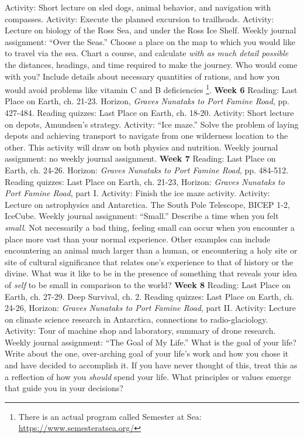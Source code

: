 \documentclass[10pt]{article}
\begin{document}
\begin{outline}[enumerate]
\2 Activity: Short lecture on sled dogs, animal behavior, and navigation with compasses.
\2 Activity: Execute the planned excursion to trailheads.
\2 Activity: Lecture on biology of the Ross Sea, and under the Ross Ice Shelf.
\2 Weekly journal assignment: ``Over the Seas.''  Choose a place on the map to which you would like to travel via the sea.  Chart a course, and calculate \textit{with as much detail possible} the distances, headings, and time required to make the journey.  Who would come with you?  Include details about necessary quantities of rations, and how you would avoid problems like vitamin C and B deficiencies \footnote{There is an actual program called Semester at Sea: \url{https://www.semesteratsea.org/}}.
\1 \textbf{Week 6}
\2 Reading: Last Place on Earth, ch. 21-23. Horizon, \textit{Graves Nunataks to Port Famine Road}, pp. 427-484.
\2 Reading quizzes: Last Place on Earth, ch. 18-20.
\2 Activity: Short lecture on depots, Amundsen's strategy.
\2 Activity: ``Ice maze.''  Solve the problem of laying depots and achieving transport to navigate from one wilderness location to the other.  This activity will draw on both physics and nutrition.
\2 Weekly journal assignment: no weekly journal assignment.
\1 \textbf{Week 7}
\2 Reading: Last Place on Earth, ch. 24-26. Horizon: \textit{Graves Nunataks to Port Famine Road}, pp. 484-512.
\2 Reading quizzes: Last Place on Earth, ch. 21-23, Horizon: \textit{Graves Nunataks to Port Famine Road}, part I.
\2 Activity: Finish the ice maze activity.
\2 Activity: Lecture on astrophysics and Antarctica.  The South Pole Telescope, BICEP 1-2, IceCube.
\2 Weekly journal assignment: ``Small.'' Describe a time when you felt \textit{small}.  Not necessarily a bad thing, feeling small can occur when you encounter a place more vast than your normal experience.  Other examples can include encountering an animal much larger than a human, or encountering a holy site or site of cultural significance that relates one's experience to that of history or the divine.  What was it like to be in the presence of something that reveals your idea of \textit{self} to be small in comparison to the world?
\1 \textbf{Week 8}
\2 Reading: Last Place on Earth, ch. 27-29.  Deep Survival, ch. 2.
\2 Reading quizzes: Last Place on Earth, ch. 24-26, Horizon: \textit{Graves Nunataks to Port Famine Road}, part II.
\2 Activity: Lecture on climate science research in Antarctica, connections to radio-glaciology.
\2 Activity: Tour of machine shop and laboratory, summary of drone research.
\2 Weekly journal assignment: ``The Goal of My Life.'' What is the goal of your life?  Write about the one, over-arching goal of your life's work and how you chose it and have decided to accomplish it.  If you have never thought of this, treat this as a reflection of how you \textit{should} spend your life.  What principles or values emerge that guide you in your decisions?

\end{outline}
\end{document}
